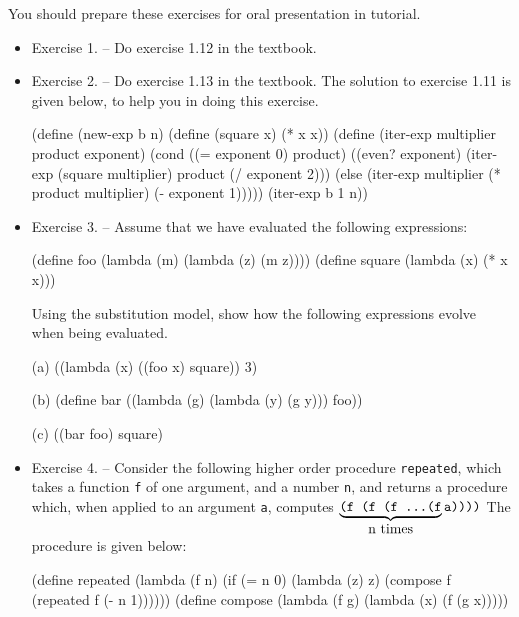 You should prepare these exercises for oral presentation in tutorial.

\begin{itemize}

\item Exercise 1. -- Do exercise 1.12  in the textbook.

\item Exercise 2. -- Do exercise 1.13  in the textbook.  The solution
to exercise 1.11 is given below, to help you in doing this exercise.

\beginlisp
(define (new-exp b n)
  (define (square x) (* x x))
  (define (iter-exp multiplier product exponent)
    (cond ((= exponent 0) product)
          ((even? exponent)
           (iter-exp (square multiplier) product (/ exponent 2)))
          (else (iter-exp multiplier
                          (* product multiplier)
                          (- exponent 1)))))
  (iter-exp b 1 n))
\endlisp

\item Exercise 3. -- Assume that we have evaluated the following
expressions:

\beginlisp
(define foo (lambda (m) (lambda (z) (m z))))
\null
(define square (lambda (x) (* x x)))
\endlisp

Using the substitution model, show
how the following expressions evolve when being evaluated.

(a)  \beginlisp((lambda (x) ((foo x) square)) 3)\endlisp

(b)  \beginlisp(define bar ((lambda (g) (lambda (y) (g y))) foo))\endlisp

(c)  \beginlisp((bar foo) square)\endlisp

\item Exercise 4. -- Consider the following higher order procedure
      {\tt repeated}, which takes a function {\tt f} of one argument, and
      a number {\tt n}, and returns a procedure which, when applied to an argument
      {\tt a}, computes 
${ \underbrace{\hbox{\tt (f (f (f \ldots (f}}_{\hbox{\rm n times}}
\hbox{\tt a))))}}$
      The procedure is given below:

\beginlisp
      (define repeated
        (lambda (f n)
          (if (= n 0)
              (lambda (z) z)
              (compose f (repeated f (- n 1))))))
\null
      (define compose
        (lambda (f g)
          (lambda (x) (f (g x)))))
\endlisp


\end{itemize}
